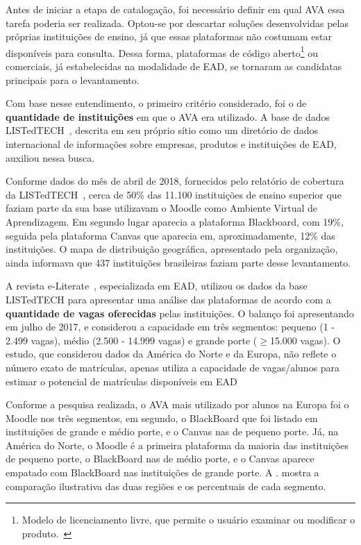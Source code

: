 Antes de iniciar a etapa de catalogação, foi necessário definir em qual AVA essa tarefa poderia ser realizada. Optou-se por descartar soluções desenvolvidas pelas próprias instituições de ensino, já que essas plataformas não costumam estar disponíveis para consulta. Dessa forma, plataformas de código aberto\footnote{Modelo de licenciamento livre, que permite o usuário examinar ou modificar o produto.~\cite{brasilportaria}} ou comerciais, já estabelecidas na modalidade de EAD, se tornaram as candidatas principais para o levantamento.

Com base nesse entendimento, o primeiro critério considerado, foi o de \textbf{quantidade de instituições} em que o AVA era utilizado. A base de dados LISTedTECH~\cite{listedtech}, descrita em seu próprio sítio como um diretório de dados internacional de informações sobre empresas, produtos e instituições de EAD, auxiliou nessa busca. 

Conforme dados do mês de  abril de 2018, fornecidos pelo relatório de cobertura da LISTedTECH~\cite{listedtech}, cerca de 50\% das 11.100 instituições de ensino superior que faziam parte da sua base utilizavam o Moodle como Ambiente Virtual de Aprendizagem. Em segundo lugar aparecia a plataforma Blackboard, com 19\%, seguida pela plataforma Canvas que aparecia em, aproximadamente, 12\% das instituições. O mapa de distribuição geográfica, apresentado pela organização, ainda informava que 437 instituições brasileiras faziam parte desse levantamento.

A revista e-Literate~\cite{phil@lms}, especializada em EAD, utilizou os dados da base LISTedTECH para apresentar uma análise das plataformas de acordo com a \textbf{quantidade de vagas oferecidas} pelas instituições. O balanço foi apresentando em julho de 2017, e considerou a capacidade em três segmentos: pequeno (1 - 2.499 vagas), médio (2.500 - 14.999 vagas) e grande porte ($\geq$15.000 vagas). O estudo, que considerou dados da América do Norte e da Europa, não reflete o número exato de matrículas, apenas utiliza a capacidade de vagas/alunos para estimar o potencial de matrículas disponíveis em EAD %

Conforme a pesquisa realizada, o AVA mais utilizado por alunos na Europa foi o Moodle nos três segmentos, em segundo, o BlackBoard que foi listado em instituições de grande e médio porte, e o Canvas nas de pequeno porte. Já, na América do Norte, o Moodle é a primeira plataforma da maioria das instituições de pequeno porte, o BlackBoard nas de médio porte, e o Canvas aparece empatado com BlackBoard nas instituições de grande porte. A . mostra a comparação ilustrativa das duas regiões e os percentuais de cada segmento.

